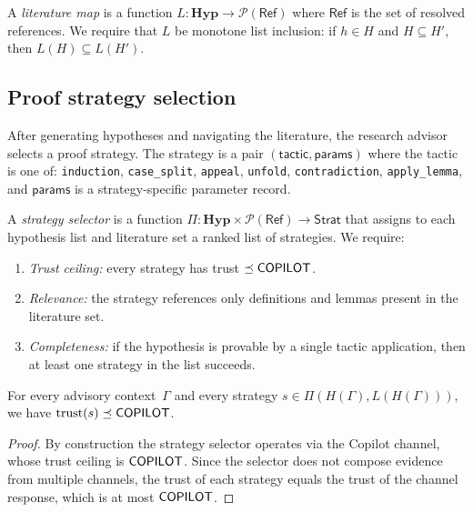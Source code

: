 \documentclass[11pt]{article}
\begin{document}
\begin{definition}\label{def:litmap}
A \emph{literature map} is a function
$L \colon \mathbf{Hyp} \to \mathcal{P}(\mathsf{Ref})$
where $\mathsf{Ref}$ is the set of resolved references.
We require that $L$ be monotone \wrt{} list inclusion:
if $h \in H$ and $H \subseteq H'$, then $L(H) \subseteq L(H')$.
\end{definition}

\subsection{Proof strategy selection}

After generating hypotheses and navigating the literature,
the research advisor selects a proof strategy.  The strategy
is a pair $(\mathsf{tactic}, \mathsf{params})$ where the
tactic is one of: \texttt{induction}, \texttt{case\_split},
\texttt{appeal}, \texttt{unfold}, \texttt{contradiction},
\texttt{apply\_lemma}, and $\mathsf{params}$ is a
strategy-specific parameter record.

\begin{definition}\label{def:stratsel}
A \emph{strategy selector} is a function
$\Pi \colon \mathbf{Hyp} \times \mathcal{P}(\mathsf{Ref})
  \to \mathsf{Strat}$
that assigns to each hypothesis list and literature set
a ranked list of strategies.  We require:
\begin{enumerate}
\item \emph{Trust ceiling:} every strategy has trust
      $\preceq \mathsf{COPILOT}$.
\item \emph{Relevance:} the strategy references only
      definitions and lemmas present in the literature set.
\item \emph{Completeness:} if the hypothesis is provable
      by a single tactic application, then at least one
      strategy in the list succeeds.
\end{enumerate}
\end{definition}

\begin{lemma}\label{lem:stratceil}
For every advisory context~$\Gamma$ and every strategy
$s \in \Pi(H(\Gamma), L(H(\Gamma)))$, we have
$\mathrm{trust}(s) \preceq \mathsf{COPILOT}$.
\end{lemma}
\begin{proof}
By construction the strategy selector operates via the
Copilot channel, whose trust ceiling is $\mathsf{COPILOT}$.
Since the selector does not compose evidence from multiple
channels, the trust of each strategy equals the trust of
the channel response, which is at most $\mathsf{COPILOT}$.
\end{proof}
\end{document}
